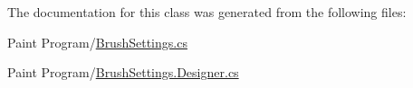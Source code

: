 The documentation for this class was generated from the following files\+:\begin{DoxyCompactItemize}
\item 
Paint Program/\mbox{\hyperlink{_brush_settings_8cs}{Brush\+Settings.\+cs}}\item 
Paint Program/\mbox{\hyperlink{_brush_settings_8_designer_8cs}{Brush\+Settings.\+Designer.\+cs}}\end{DoxyCompactItemize}
